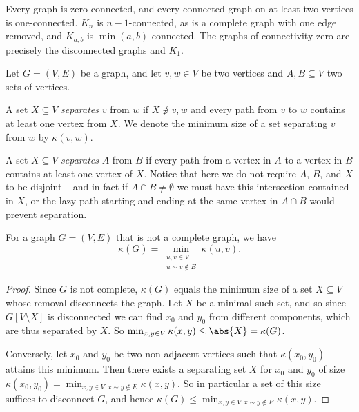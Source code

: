 \documentclass[nobib]{tufte-handout}
\begin{document}
\begin{example}
  Every graph is zero-connected, and every connected graph on at least two vertices is one-connected. $K_n$ is $n-1$-connected, as is a complete graph with one edge removed, and $K_{a,b}$ is $\min(a,b)$-connected. The graphs of connectivity zero are precisely the disconnected graphs and $K_1$.
\end{example}

\begin{definition}
  Let $G = (V,E)$ be a graph, and let $v, w \in V$ be two vertices and $A, B \subseteq V$ two sets of vertices.

  A set $X \subseteq V$ \emph{separates} $v$ from $w$ if $X \not\ni v, w$ and every path from $v$ to $w$ contains at least one vertex from $X$. We denote the minimum size of a set separating $v$ from $w$ by $\kappa(v,w)$.

  A set $X \subseteq V$ \emph{separates} $A$ from $B$ if every path from a vertex in $A$ to a vertex in $B$ contains at least one vertex of $X$. Notice that here we do not require $A$, $B$, and $X$ to be disjoint -- and in fact if $A\cap B\neq \emptyset$ we must have this intersection contained in $X$, or the lazy path starting and ending at the same vertex in $A\cap B$ would prevent separation.
\end{definition}

\begin{lemma}\label{lemma:connectivity_is_min_of_pairwise_connectivity}
  For a graph $G = (V,E)$ that is not a complete graph, we have
  $$\kappa(G) = \min_{\substack{u, v \in V\\u\sim v \not\in E}} \kappa(u,v).$$

  \begin{proof}
    Since $G$ is not complete, $\kappa(G)$ equals the minimum size of a set $X \subseteq V$ whose removal disconnects the graph. Let $X$ be a minimal such set, and so since $G[V \setminus X]$ is disconnected we can find $x_0$ and $y_0$ from different components, which are thus separated by $X$. So $\min_{x,y \in V} \kappa(x,y) \leq \abs{X} = \kappa(G)$.

    Conversely, let $x_0$ and $y_0$ be two non-adjacent vertices such that $\kappa(x_0, y_0)$ attains this minimum. Then there exists a separating set $X$ for $x_0$ and $y_0$ of size $\kappa(x_0, y_0) = \min_{x,y \in V: x\sim y \not\in E} \kappa(x, y)$. So in particular a set of this size suffices to disconnect $G$, and hence $\kappa(G) \leq \min_{x,y \in V: x\sim y \not\in E} \kappa(x, y)$.
  \end{proof}
\end{lemma}
\end{document}
